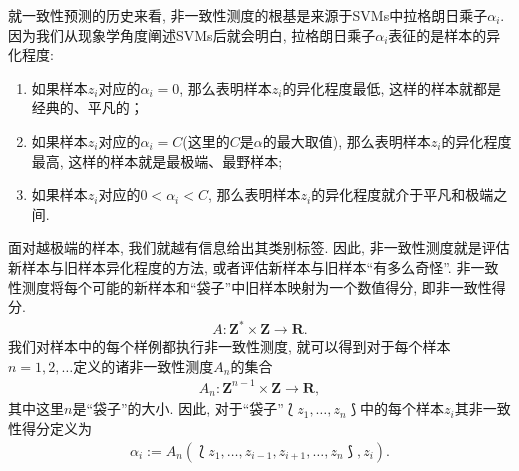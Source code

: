 就一致性预测的历史来看, \textsf{非一致性测度}的根基是来源于SVMs中拉格朗日乘子$\alpha_{i}$. 因为我们从现象学角度阐述SVMs后就会明白, 拉格朗日乘子$\alpha_{i}$表征的是样本的异化程度:
\begin{enumerate}
\item 如果样本$z_{i}$对应的$\alpha_{i} = 0$, 那么表明样本$z_{i}$的异化程度最低, 这样的样本就都是经典的、平凡的；
\item 如果样本$z_{i}$对应的$\alpha_{i} = C$(这里的$C$是$\alpha$的最大取值), 那么表明样本$z_{i}$的异化程度最高, 这样的样本就是最极端、最野样本;
\item 如果样本$z_{i}$对应的$0 < \alpha_{i} < C$, 那么表明样本$z_{i}$的异化程度就介于平凡和极端之间.
\end{enumerate}

面对越极端的样本, 我们就越有信息给出其类别标签. 因此, 非一致性测度就是评估新样本与旧样本异化程度的方法, 或者评估新样本与旧样本“有多么奇怪”. 非一致性测度将每个可能的新样本和“袋子”中旧样本映射为一个数值得分, 即非一致性得分.
\begin{align}
\label{nonconformity-score}
A: \mathbf{Z}^{*} \times \mathbf{Z} \rightarrow \mathbf{R}.
\end{align}
我们对样本中的每个样例都执行非一致性测度, 就可以得到对于每个样本$n = 1, 2, \ldots$定义的诸非一致性测度$A_{n}$的集合
\begin{align}
\label{nonconformity-set}
A_{n}: \mathbf{Z}^{n-1} \times \mathbf{Z} \rightarrow \mathbf{R},
\end{align}
其中这里$n$是“袋子”的大小. 因此, 对于“袋子”$\Lbag z_1, \ldots, z_{n} \Rbag$中的每个样本$z_{i}$其非一致性得分定义为
\begin{align}
\label{nonconformity-score-zi}
\alpha_{i} := A_{n}(\Lbag z_1, \ldots, z_{i-1}, z_{i+1}, \ldots, z_{n} \Rbag, z_{i}).
\end{align}

